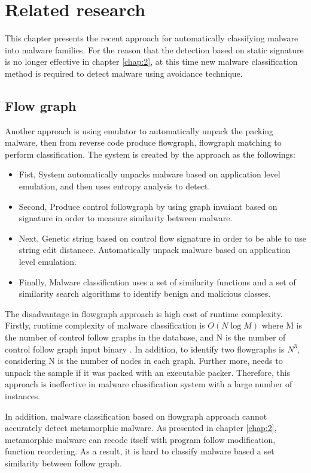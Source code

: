 \chapter{Related research}\label{chap:3}
%
%
This chapter presents the recent approach for automatically classifying malware into malware families. For the reason that the detection based on static signature is no longer effective in chapter \ref{chap:2}, at this time new malware classification method is required to detect malware using avoidance technique.

\section{Flow graph}
Another approach is using emulator to automatically unpack the packing malware, then from reverse code produce flowgraph, flowgraph matching to perform classification\cite{silvio}. The system is created by the approach as the followings:

\begin{itemize}
\item Fist, System automatically unpacks malware based on application level emulation, and then uses entropy analysis to detect.
\item Second, Produce control followgraph by using graph invaiant based on signature in order to measure similarity between malware.
\item Next, Genetic string based on control flow signature in order to be able to use string edit distancce. Automatically unpack malware based on application level emulation.
\item Finally, Malware classification uses a set of  similarity functions and a set of similarity search algorithms to identify benign and malicious classes.
\end{itemize}

The disadvantage in flowgraph approach is high cost of runtime complexity. Firstly, runtime complexity of malware classification is $O(N\log{M})$ where M is the number of control follow graphs in the database, and N is the number of control follow graph input binary \cite{silvio}. In addition, to identify two flowgraphs is $N^{3}$, considering N is the number of nodes in each graph. Further more, needs to unpack the sample if it was packed with an executable packer. Therefore, this approach is ineffective in malware classification system with a large number of instances.

In addition, malware classification based on flowgraph approach cannot accurately detect metamorphic malware. As presented in chapter \ref{chap:2}, metamorphic malware can recode itself with program follow modification, function reordering. As a result, it is hard to classify malware based a set  similarity between follow graph.
